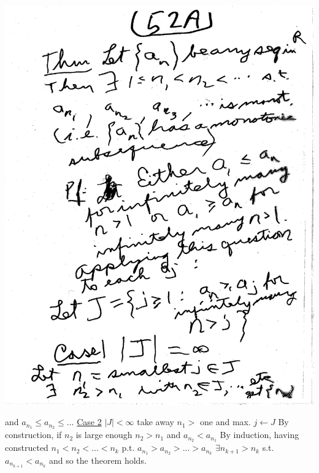 \documentclass[10pt,a4paper]{article}
\begin{document}
{{\includegraphics[scale=.5]{Pages/SL_10} 

\newpage

and $a_{n_{1}} \leq a_{n_{2}} \leq ...$ \newline
\underline{Case 2} $|J| < \infty$
take away $n_1 >$ one and max. $j \leftarrow J$ \newline
By construction, if $n_2$ is large enough $n_2 > n_1$ and $a_{n_{2}} < a_{n_{1}}$
By induction, having constructed $n_1 < n_2 < ... < n_k$ p.t. $a_{n_{1}} > a_{n_{2}} > ... > a_{n_{k}}$
$\exists n_{k+1} > n_k$ s.t. 
$a_{n_{k+1}} < a_{n_{k}}$ \newline
and so the theorem holds. 

}}
\end{document}
